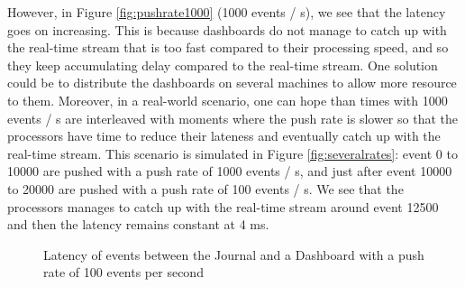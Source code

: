 However, in Figure \ref{fig:pushrate1000} (1000 events / s), we see that the latency goes on increasing. This is because dashboards do not manage to catch up with the real-time stream that is too fast compared to their processing speed, and so they keep accumulating delay compared to the real-time stream. One solution could be to distribute the dashboards on several machines to allow more resource to them. Moreover, in a real-world scenario, one can hope than times with 1000 events / s are interleaved with moments where the push rate is slower so that the processors have time to reduce their lateness and eventually catch up with the real-time stream. This scenario is simulated in Figure \ref{fig:severalrates}: event 0 to 10000 are pushed with a push rate of 1000 events / s, and just after event 10000 to 20000 are pushed with a push rate of 100 events / s. We see that the processors manages to catch up with the real-time stream around event 12500 and then the latency remains constant at 4 ms.
\\

\begin{figure}
  \begin{center} 
    \caption{Latency of events between the Journal and a Dashboard with a push rate of 100 events per second}
    \label{fig:pushrate100}
  \end{center}
\end{figure}

